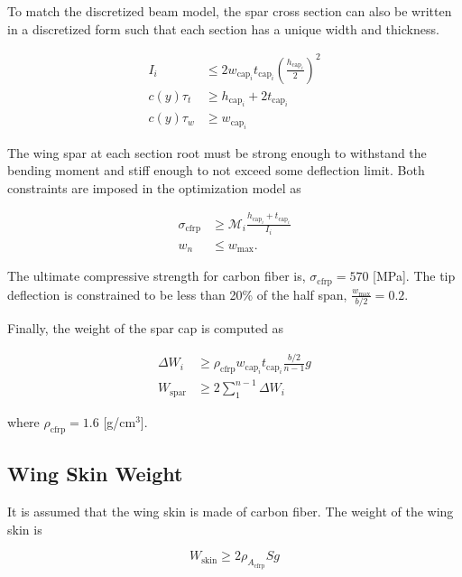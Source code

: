 \documentclass[]{aiaa-tc}%
\begin{document}
To match the discretized beam model, the spar cross section can also be written in a discretized form such that each section has a unique width and thickness. 

\begin{align}
    I_i &\leq 2w_{\text{cap}_i}t_{\text{cap}_i}\left(\frac{h_{\text{cap}_i}}{2}\right)^2 \\
    c(y)\tau_t &\geq h_{\text{cap}_i} + 2t_{\text{cap}_i} \\
    c(y)\tau_w &\geq w_{\text{cap}_i} 
\end{align}

The wing spar at each section root must be strong enough to withstand the bending moment and stiff enough to not exceed some deflection limit.  Both constraints are imposed in the optimization model as

\begin{align}
    \label{e:stresscont}
    \sigma_{\text{cfrp}} &\geq \mathcal{M}_i \frac{h_{\text{cap}_i}+t_{\text{cap}_i}}{I_i}\\
    \label{e:defcont}
    w_n &\leq w_{\text{max}}.
\end{align}

The ultimate compressive strength for carbon fiber is, $\sigma_{\text{cfrp}} = 570$ [MPa].\cite{carbonfiber}
The tip deflection is constrained to be less than 20\% of the half span, $\frac{w_{\text{max}}}{b/2} = 0.2$.

Finally, the weight of the spar cap is computed as

\begin{align}
    \label{e:sparmass}
    \Delta W_i &\geq \rho_{\text{cfrp}} w_{\text{cap}_i}t_{\text{cap}_i} \frac{b/2}{n-1}g \\
    \label{e:sparmasssum}
    W_{\text{spar}} &\geq 2 \sum\limits_{1}^{n-1} \Delta W_i
\end{align}

where $\rho_{\text{cfrp}} = 1.6$ [g/cm$^3$].\cite{carbonfiber}

\subsection{Wing Skin Weight}

It is assumed that the wing skin is made of carbon fiber.  The weight of the wing skin is 

\begin{equation}
    \label{e:wingskinweight}
    W_{\text{skin}} \geq 2 \rho_{A_{\text{cfrp}}} S g 
\end{equation}
\end{document}
